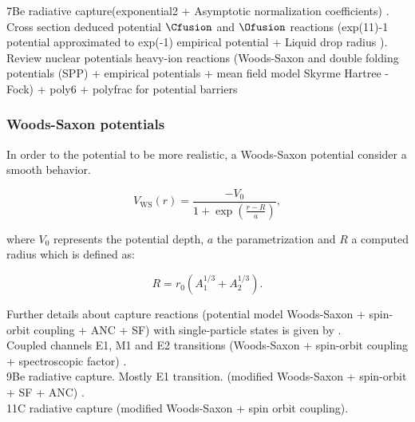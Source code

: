 \documentclass[openany]{book}
\begin{document}
7Be radiative capture(exponential2 + Asymptotic normalization coefficients) \cite{tursunov_turakulov_kadyrov_blokhintsev_2021}. \\

Cross section deduced potential  $\Cfusion$ and $\Ofusion$ reactions (exp(11)-1 potential approximated to exp(-1) empirical potential + Liquid drop radius )\cite{bass_1977}. \\

Review nuclear potentials heavy-ion reactions (Woods-Saxon and double folding potentials (SPP) + empirical potentials  + mean field model Skyrme Hartree - Fock) + poly6 + polyfrac for potential barriers \cite{nandi_swami_gupta_kumar_chakraborty_manjunatha_2022}

\subsubsection{Woods-Saxon potentials} \label{sub:potential_effective_woodsSaxon}

In order to the potential to be more realistic, a Woods-Saxon potential consider a smooth behavior.

\begin{equation} \label{eq:potential_WoodsSaxon}
	V_{\mathrm{WS}}(r) = \frac{-V_0}{1 + \exp  \left({\frac{r-R}{a}}\right)},
\end{equation}

where $V_0$ represents the potential depth, $a$ the parametrization and $R$ a computed radius which is defined as: 

\begin{equation} \label{eq:potential_WoodsSaxon_radius}
	R = r_0(A_1^{1/3} + A_2^{1/3}).
\end{equation}

Further details about capture reactions (potential model Woods-Saxon + spin-orbit coupling + ANC + SF) with single-particle states is given by \cite{huang_bertulani_guimaraes_2010}. \\

Coupled channels  E1, M1 and E2 transitions (Woods-Saxon + spin-orbit coupling + spectroscopic factor) \cite{bertulani_1996}. \\

9Be radiative capture. Mostly E1 transition.  (modified Woods-Saxon + spin-orbit + SF + ANC) \cite{kabir_nabi_2021}. \\

11C radiative capture (modified Woods-Saxon + spin orbit coupling)\cite{kabir_irgaziev_nabi_sagheer_2022}. \\
\end{document}

